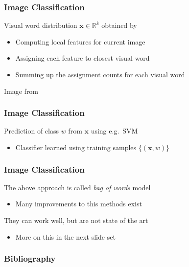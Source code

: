 \documentclass[xetex,professionalfont]{beamer}
\newcommand{\RR}{\mathbb{R}}
\renewcommand{\vec}[1]{\ensuremath{\mathbf{#1}}}
\newcommand{\vx}{\vec{x}}
\begin{document}

\begin{frame}
\frametitle{Image Classification}

Visual word distribution $\vx\in\RR^k$ obtained by
\begin{itemize}
    \item Computing local features for current image
    \item Assigning each feature to closest visual word
    \item Summing up the assignment counts for each visual word
\end{itemize}

\begin{center}
    {\centering Image from \cite{grauman2011}}
\end{center}

\end{frame}


\begin{frame}
\frametitle{Image Classification}

Prediction of class $w$ from $\vx$ using e.g.\ SVM %
\begin{itemize}
    \item Classifier learned using training samples $\{(\vx,w)\}$
\end{itemize}

\bigskip
\begin{center}
\end{center}

\end{frame}


\begin{frame}
\frametitle{Image Classification}

The above approach is called \emph{bag of words} model
\begin{itemize}
    \item Many improvements to this methods exist
\end{itemize}

\bigskip
They can work well, but are not state of the art
\begin{itemize}
    \item More on this in the next slide set
\end{itemize}

\end{frame}


\begin{frame}[allowframebreaks=0.8]
\frametitle{Bibliography}

\printbibliography

\end{frame}
\end{document}
